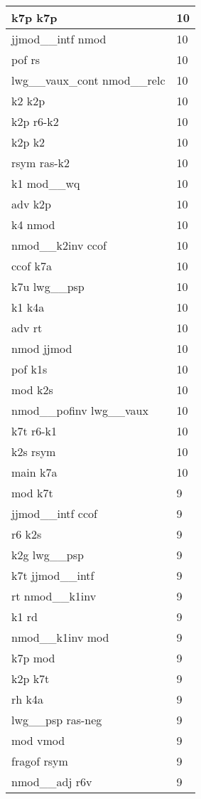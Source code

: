 \documentclass[a4 paper]{article}
\begin{document}
\begin{longtable}{p{}p{}}
k7p k7p  & 10 \\ \midrule
jjmod\_\_intf nmod  & 10 \\ \midrule
pof rs  & 10 \\ \midrule
lwg\_\_vaux\_cont nmod\_\_relc  & 10 \\ \midrule
k2 k2p  & 10 \\ \midrule
k2p r6-k2  & 10 \\ \midrule
k2p k2  & 10 \\ \midrule
rsym ras-k2  & 10 \\ \midrule
k1 mod\_\_wq  & 10 \\ \midrule
adv k2p  & 10 \\ \midrule
k4 nmod  & 10 \\ \midrule
nmod\_\_k2inv ccof  & 10 \\ \midrule
ccof k7a  & 10 \\ \midrule
k7u lwg\_\_psp  & 10 \\ \midrule
k1 k4a  & 10 \\ \midrule
adv rt  & 10 \\ \midrule
nmod jjmod  & 10 \\ \midrule
pof k1s  & 10 \\ \midrule
mod k2s  & 10 \\ \midrule
nmod\_\_pofinv lwg\_\_vaux  & 10 \\ \midrule
k7t r6-k1  & 10 \\ \midrule
k2s rsym  & 10 \\ \midrule
main k7a  & 10 \\ \midrule
mod k7t  & 9 \\ \midrule
jjmod\_\_intf ccof  & 9 \\ \midrule
r6 k2s  & 9 \\ \midrule
k2g lwg\_\_psp  & 9 \\ \midrule
k7t jjmod\_\_intf  & 9 \\ \midrule
rt nmod\_\_k1inv  & 9 \\ \midrule
k1 rd  & 9 \\ \midrule
nmod\_\_k1inv mod  & 9 \\ \midrule
k7p mod  & 9 \\ \midrule
k2p k7t  & 9 \\ \midrule
rh k4a  & 9 \\ \midrule
lwg\_\_psp ras-neg  & 9 \\ \midrule
mod vmod  & 9 \\ \midrule
fragof rsym  & 9 \\ \midrule
nmod\_\_adj r6v  & 9 \\ \midrule

\end{longtable}
\end{document}
